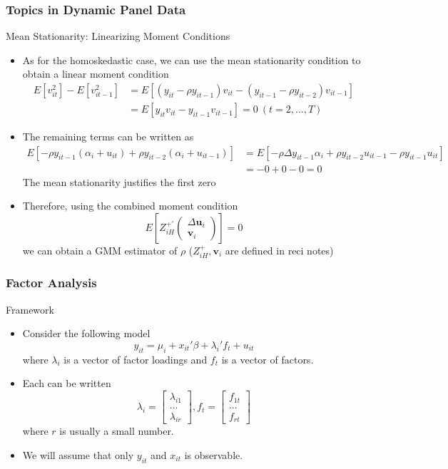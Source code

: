 \documentclass{beamer}
\begin{document}
\begin{frame}
\frametitle{Topics in Dynamic Panel Data}
Mean Stationarity: Linearizing Moment Conditions
\begin{itemize}
\item As for the homoskedastic case, we can use the mean stationarity condition to obtain a linear moment condition
\begin{align*}
E[v_{it}^2]-E[v_{it-1}^2]&=E[(y_{it}-\rho y_{it-1})v_{it}-(y_{it-1}-\rho y_{it-2})v_{it-1}]\\
&=E[y_{it}v_{it}-y_{it-1}v_{it-1}]=0 \ (t=2,...,T)
\end{align*}
\item The remaining terms can be written as
\footnotesize{\begin{align*}
E[-\rho y_{it-1} (\alpha_i + u_{it})+\rho y_{it-2}(\alpha_i+u_{it-1})]&=E[-\rho \Delta y_{it-1}\alpha_i +\rho y_{it-2}u_{it-1}-\rho y_{it-1}u_{it}]\\&=-0+0-0=0
\end{align*}}\normalsize
The mean stationarity justifies the first zero
\item Therefore, using the combined moment condition
\[
E\left[Z_{iH}^{+'} \begin{pmatrix} \Delta \mathbf{u}_i \\ \mathbf{v}_i\end{pmatrix}\right]=0
\]
we can obtain a GMM estimator of $\rho$ ($Z_{iH}^+, \mathbf{v}_i$ are defined in reci notes)
\end{itemize}
\end{frame}

\begin{frame}
\frametitle{Factor Analysis}
Framework
\begin{itemize}
\item Consider the following model
\[
y_{it}=\mu_i+x_{it}'\beta + \lambda_i'f_t + u_{it}
\]
where $\lambda_i$ is a vector of factor loadings and $f_t$ is a vector of factors.
\item  Each can be written
\[
\lambda_i = \begin{bmatrix}\lambda_{i1}\\ ... \\ \lambda_{ir} \end{bmatrix}, f_t = \begin{bmatrix}f_{1t}\\ ... \\ f_{rt} \end{bmatrix}
\]
where $r$ is usually a small number. 
\item We will assume that only $y_{it}$ and $x_{it}$ is observable. 
\end{itemize}
\end{frame}
\end{document}
